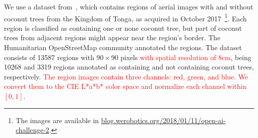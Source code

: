 \documentclass[journal, twoside]{IEEEtran}
\begin{document}
We use a dataset from~\cite{8899005}, which contains regions of aerial images with and without coconut trees from the Kingdom of Tonga, as acquired in October 2017~\footnote{The images are available in \url{blog.werobotics.org/2018/01/11/open-ai-challenge-2}.}. Each region is classified as containing one or none coconut tree, but part of coconut trees from adjacent regions might appear near the region's border. The Humanitarian OpenStreetMap community annotated the regions. The dataset consists of 13587 regions with $90 \times 90$ pixels \textcolor{red}{with spatial resolution of $8$\si{\centi\metre}}, being 10268 and 3319 regions annotated as containing and not containing coconut trees, respectively. \textcolor{red}{The region images contain three channels: red, green, and blue. We convert them to the CIE L*a*b* color space and normalize each channel within $[0,1]$}.
\end{document}
